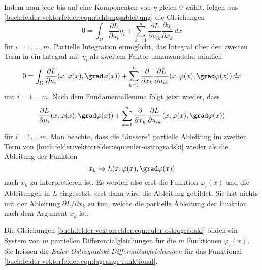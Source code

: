 Indem man jede bis auf eine Komponenten von $\eta$ gleich $0$
wählt, folgen aus
\eqref{buch:felder:vektorfelder:eqn:richtungsableitung}
die Gleichungen
\begin{equation*}
0
=
\int_{\Omega}
\frac{\partial L}{\partial u_i}
\eta_i
+
\sum_{k=1}^n
\frac{\partial L}{\partial u_{ik}}
\frac{\partial \eta_i}{\partial x_k}
\,dx
\end{equation*}
für $i=1,\dots,m$.
Partielle Integration ermöglicht, das Integral über den zweiten
Term in ein Integral mit $\eta_i$ als zweitem Faktor umzuwandeln,
nämlich
\begin{equation*}
0
=
\int_{\Omega}
\frac{\partial L}{\partial u_i}
(x,\varphi(x),\grad\varphi(x))
+
\sum_{k=1}^n
\frac{\partial}{\partial x_k}
\frac{\partial L}{\partial u_{ik}}
(x,\varphi(x),\grad\varphi(x))
\,dx
\end{equation*}
mit $i=1,\dots m$.
Nach dem Fundamentallemma folgt jetzt wieder, dass
\begin{equation}
\frac{\partial L}{\partial u_i}
(x,\varphi(x),\grad\varphi(x))
+
\sum_{k=1}^n
\frac{\partial}{\partial x_k}
\frac{\partial L}{\partial u_{ik}}
(x,\varphi(x),\grad\varphi(x))
\label{buch:felder:vektorrelder:eqn:euler-ostrogradski}
\end{equation}
für $i=1,\dots m$.
Man beachte, dass die ``äussere'' partielle Ableitung im zweiten Term
von
\eqref{buch:felder:vektorrelder:eqn:euler-ostrogradski}
wieder als die Ableitung der Funktion
\[
x_k
\mapsto
L(x,\varphi(x),\grad\varphi(x))
\]
nach $x_k$ zu interpretieren ist.
Es werden also erst die Funktion $\varphi_i(x)$ und die Ableitungen
in $L$ eingesetzt, erst dann wird die Ableitung gebildet.
Sie hat nichts mit der Ableitung $\partial L/\partial x_k$ zu tun, welche
die partielle Ableitung der Funktion nach dem Argument $x_k$ ist.


Die Gleichungen
\eqref{buch:felder:vektorrelder:eqn:euler-ostrogradski}
bilden ein System von $m$ partiellen Differentialgleichungen
für die $m$ Funktionen $\varphi_i(x)$.
Sie heissen die {\em Euler-Ostrogradski-Differentialgleichungen}
für das Funktional
\eqref{buch:felder:vektorfelder:eqn:lagrange-funktional}.



